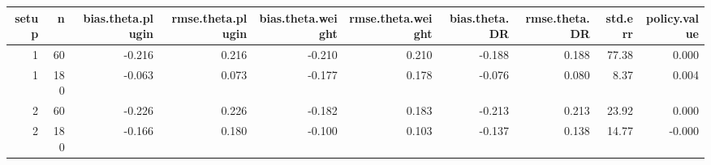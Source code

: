 \begin{table}[ht]
\centering
\begin{tabular}{rrrrrrrrrr}
  \hline
setup & n & bias.theta.plugin & rmse.theta.plugin & bias.theta.weight & rmse.theta.weight & bias.theta.DR & rmse.theta.DR & std.err & policy.value \\ 
  \hline
1 & 60 & -0.216 & 0.216 & -0.210 & 0.210 & -0.188 & 0.188 & 77.38 & 0.000 \\ 
  1 & 180 & -0.063 & 0.073 & -0.177 & 0.178 & -0.076 & 0.080 & 8.37 & 0.004 \\ 
  2 & 60 & -0.226 & 0.226 & -0.182 & 0.183 & -0.213 & 0.213 & 23.92 & 0.000 \\ 
  2 & 180 & -0.166 & 0.180 & -0.100 & 0.103 & -0.137 & 0.138 & 14.77 & -0.000 \\ 
   \hline
\end{tabular}
\end{table}
